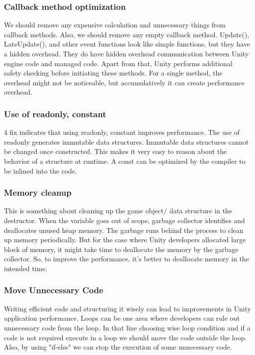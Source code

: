 \subsubsection{Callback method optimization}
We should remove any expensive calculation and unnecessary things from callback methods. Also, we should remove any empty callback method. Update(), LateUpdate(), and other event functions look like simple functions, but they have a hidden overhead. They do have hidden overhead communication between Unity engine code and managed code. Apart from that, Unity performs additional safety checking before initiating these methods. For a single method, the overhead might not be noticeable, but accumulatively it can create performance overhead.


\subsubsection{Use of readonly, constant}
4 fix indicates that using readonly, constant improves performance. The use of readonly generates immutable data structures. Immutable data structures cannot be changed once constructed. This makes it very easy to reason about the behavior of a structure at runtime. A const can be optimized by the compiler to be inlined into the code.

\subsubsection{Memory cleanup}
This is something about cleaning up the game object/ data structure in the destructor. When the variable goes out of scope, garbage collector identifies and deallocates unused heap memory. The garbage runs behind the process to clean up memory periodically. But for the case where Unity developers allocated large block of memory, it might take time to deallocate the memory by the garbage collector. So, to improve the performance, it's better to deallocate memory in the intended time.

\subsubsection{Move Unnecessary Code}
Writing efficient code and structuring it wisely can lead to improvements in Unity application performance. Loops can be one area where developers can rule out unnecessary code from the loop. In that line choosing wise loop condition and if a code is not required execute in a loop we should move the code outside the loop. Also, by using "if-else" we can stop the execution of some unnecessary code. 



